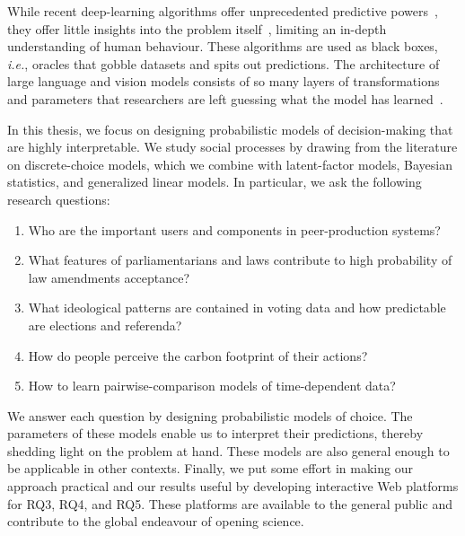 While recent deep-learning algorithms offer unprecedented predictive powers~\citep{lecun2015deep}, they offer little insights into the problem itself~\citep{rudin2019stop}, limiting an in-depth understanding of human behaviour.
These algorithms are used as black boxes, \textit{i.e.}, oracles that gobble datasets and spits out predictions.
The architecture of large language and vision models consists of so many layers of transformations and parameters that researchers are left guessing what the model has learned~\citep{fong2017interpretable,guidotti2018survey,olah2020zoom,hilton2020understanding}.

In this thesis, we focus on designing probabilistic models of decision-making that are highly interpretable.
We study social processes by drawing from the literature on discrete-choice models, which we combine with latent-factor models, Bayesian statistics, and generalized linear models.
In particular, we ask the following research questions:
\begin{enumerate}[
		leftmargin=1.5cm,
		topsep=0cm,
		parsep=0.0pt,
		itemsep=1.5pt,
		label=\textbf{RQ\arabic*}
	]
	\item Who are the important users and components in peer-production systems?
	\item What features of parliamentarians and laws contribute to high probability of law amendments acceptance?
	\item What ideological patterns are contained in voting data and how predictable are elections and referenda?
	\item How do people perceive the carbon footprint of their actions?
	\item How to learn pairwise-comparison models of time-dependent data?
\end{enumerate}
We answer each question by designing probabilistic models of choice.
The parameters of these models enable us to interpret their predictions, thereby shedding light on the problem at hand.
These models are also general enough to be applicable in other contexts.
Finally, we put some effort in making our approach practical and our results useful by developing interactive Web platforms for RQ3, RQ4, and RQ5.
These platforms are available to the general public and contribute to the global endeavour of opening science.
